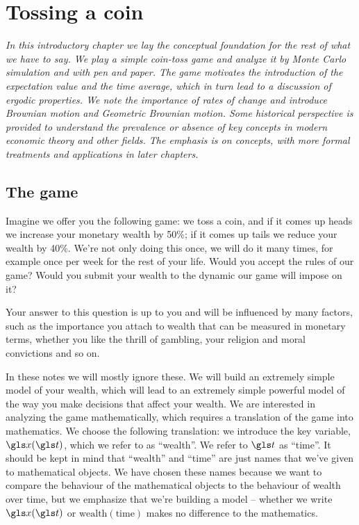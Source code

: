 
\section{Tossing a coin}

{\it In this introductory chapter we lay the conceptual foundation for the rest 
of what we have to say. We play a simple coin-toss game and analyze it 
by Monte Carlo simulation and with pen and paper. The game motivates the 
introduction of the expectation value and the time average, which in turn 
lead to a discussion of ergodic properties. We note the importance of rates 
of change and introduce Brownian motion and Geometric Brownian motion.
Some historical perspective is provided to understand the prevalence or
absence of key concepts in modern economic theory and other fields.
The emphasis is on concepts, with more formal treatments and applications
in later chapters.}
\newpage

\subsection{The game}
Imagine we offer you the following game: we toss a coin, and if it comes 
up heads we increase your monetary wealth by 50\%; if 
it comes up tails we reduce your wealth by 40\%. We're not only 
doing this once, we will do it many times, for example 
once per week for the rest of your life. Would you accept 
the rules of our game? Would you submit your wealth to 
the dynamic our game will impose on it?

Your answer to this question is up to you and will be 
influenced by many factors, such as the importance 
you attach to wealth that can be measured in monetary 
terms, whether you like the thrill of gambling, your 
religion and moral convictions and so on.

In these notes we will mostly ignore these.
We will build an extremely simple model of your 
wealth, which will lead to an extremely simple
powerful model of the way you make decisions that affect 
your wealth. We are interested in analyzing the 
game mathematically, which requires a translation 
of the game into mathematics. We choose the 
following translation: we introduce the key 
variable, $\x(\t)$, which we refer to as ``wealth''. 
We refer to $\t$ as ``time''. It should be kept in mind that
``wealth'' and ``time'' are just names that we've given to 
mathematical objects. We have chosen these names because
we want to compare the behaviour of the mathematical
objects to the behaviour of wealth over time, but
we emphasize that we're building a model -- whether we write $\x(\t)$ 
or $\text{wealth}(\text{time})$ makes no difference to the mathematics. 

